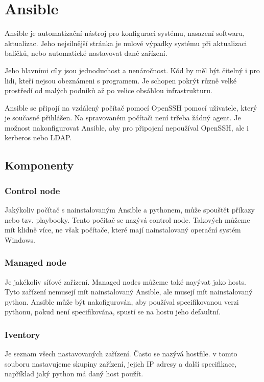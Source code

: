 \section{Ansible}

Ansible je automatizační nástroj pro konfiguraci systému, nasazení softwaru, aktualizac. Jeho nejsilnější stránka je nulové výpadky systému při aktualizaci balíčků, nebo automatické nastavovat dané zařízení. 

Jeho hlavními cíly jsou jednoduchost a nenáročnost. Kód by měl být čitelný i pro lidi, kteří nejsou obeznámeni s programem. Je schopen pokrýt různě velké prostředí od malých podniků až po velice obsáhlou infrastrukturu. 

Ansible se připojí na vzdálený počítač pomocí OpenSSH pomocí uživatele, který je současně přihlášen. Na spravovaném počítači není trřeba žádný agent. Je možnost nakonfigurovat Ansible, aby pro připojení nepoužíval OpenSSH, ale i kerberos nebo LDAP. 

\subsection{Komponenty}

\subsubsection{Control node}

Jakýkoliv počítač s nainstalovaným Ansible a pythonem, může spouštět příkazy nebo tzv. playbooky. Tento počítač se nazývá control node. Takových můžeme mít klidně více, ne však počítače, které mají nainstalovaný operační systém Windows. 

\subsubsection{Managed node}

Je jakékoliv síťové zařízení. Managed nodes můžeme také nayývat jako hosts. Tyto zařízení nemusejí mít nainstalovaný Ansible, ale musejí mít nainstalovaný python. Ansible může být nakofigurován, aby používal specifikovanou verzi pythonu, pokud není specifikována, spustí se na hostu jeho defaultní.

\subsubsection{Iventory}

Je seznam všech nastavovaných zařízení. Často se nazývá hostfile. v tomto souboru nastavujeme skupiny zařízení, jejich IP adresy a další specifikace, například jaký python má daný host použít. 

